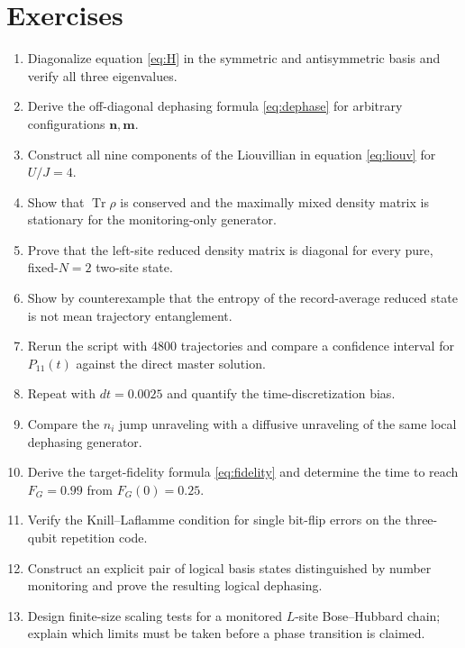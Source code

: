 \documentclass[11pt,a4paper]{article}
\newcommand{\tr}{\operatorname{Tr}}\newcommand{\D}{\mathcal D}\newcommand{\ket}[1]{|#1\rangle}\newcommand{\bra}[1]{\langle#1|}\newcommand{\E}{\mathbb E}\newcommand{\ip}[2]{\langle#1|#2\rangle}
\begin{document}
\section{Exercises}
\begin{enumerate}[leftmargin=*,itemsep=4pt]
\item Diagonalize equation \eqref{eq:H} in the symmetric and antisymmetric basis and verify all three eigenvalues.
\item Derive the off-diagonal dephasing formula \eqref{eq:dephase} for arbitrary configurations $\mathbf n,\mathbf m$.
\item Construct all nine components of the Liouvillian in equation \eqref{eq:liouv} for $U/J=4$.
\item Show that $\tr\rho$ is conserved and the maximally mixed density matrix is stationary for the monitoring-only generator.
\item Prove that the left-site reduced density matrix is diagonal for every pure, fixed-$N=2$ two-site state.
\item Show by counterexample that the entropy of the record-average reduced state is not mean trajectory entanglement.
\item Rerun the script with 4800 trajectories and compare a confidence interval for $P_{11}(t)$ against the direct master solution.
\item Repeat with $dt=0.0025$ and quantify the time-discretization bias.
\item Compare the $n_i$ jump unraveling with a diffusive unraveling of the same local dephasing generator.
\item Derive the target-fidelity formula \eqref{eq:fidelity} and determine the time to reach $F_G=0.99$ from $F_G(0)=0.25$.
\item Verify the Knill--Laflamme condition for single bit-flip errors on the three-qubit repetition code.
\item Construct an explicit pair of logical basis states distinguished by number monitoring and prove the resulting logical dephasing.
\item Design finite-size scaling tests for a monitored $L$-site Bose--Hubbard chain; explain which limits must be taken before a phase transition is claimed.
\end{enumerate}
\end{document}
